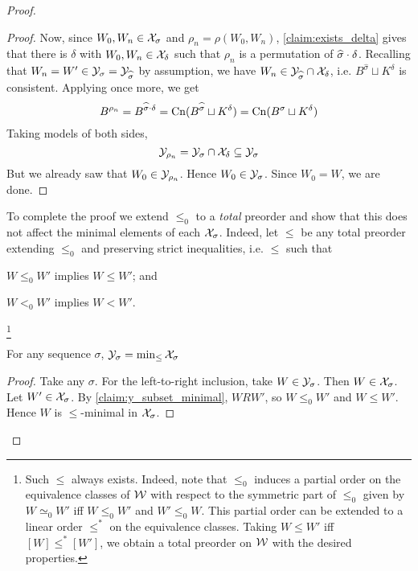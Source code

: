 \begin{proof}
\begin{proof}
        Now, since $W_0, W_n \in \mathcal{X}_\sigma$ and $\rho_n = \rho(W_0, W_n)$,
        \cref{claim:exists_delta} gives that there is $\delta$ with $W_0, W_n
        \in \mathcal{X}_{\delta}$ such that $\rho_n$ is a permutation of
        $\widehat{\sigma} \cdot \delta$. Recalling that $W_n = W' \in
        \mathcal{Y}_\sigma = \mathcal{Y}_{\widehat{\sigma}}$ by assumption, we have $W_n \in
        \mathcal{Y}_{\widehat{\sigma}} \cap \mathcal{X}_\delta$, i.e. $B^{\widehat{\sigma}}
        \sqcup K^\delta$ is consistent. Applying \incvac{} once
        more, we get
        \[
            B^{\rho_n}
            = B^{\widehat{\sigma} \cdot \delta}
            = \operatorname{Cn}(B^{\widehat{\sigma}} \sqcup K^\delta)
            = \operatorname{Cn}(B^{\sigma} \sqcup K^\delta)
        \]
        Taking models of both sides,
        \[
            \mathcal{Y}_{\rho_n} = \mathcal{Y}_{\sigma} \cap \mathcal{X}_\delta \subseteq \mathcal{Y}_\sigma
        \]
        But we already saw that $W_0 \in \mathcal{Y}_{\rho_n}$. Hence $W_0 \in
        \mathcal{Y}_\sigma$. Since $W_0 = W$, we are done.
    \end{proof}

To complete the proof we extend $\le_0$ to a \emph{total} preorder and show
that this does not affect the minimal elements of each $\mathcal{X}_\sigma$. Indeed, let
$\le$ be any total preorder extending $\le_0$ and preserving strict
inequalities, i.e. $\le$ such that
\begin{inlinelist}
    \item $W \le_0 W'$ implies $W \le W'$; and
    \item\label{item:strict_ineq_preserved} $W <_0 W'$ implies $W < W'$.
\end{inlinelist}\footnote{
    Such $\le$ always exists. Indeed, note that $\le_0$ induces a partial order
    on the equivalence classes of $\mathcal{W}$ with respect to the symmetric part of
    $\le_0$ given by $W \simeq_0 W'$ iff $W \le_0 W'$ and $W' \le_0 W$. This
    partial order can be extended to a linear order $\le^*$ on the equivalence
    classes. Taking $W \le W'$ iff $[W]  \le^* [W']$, we obtain a total
    preorder on $\mathcal{W}$ with the desired properties.
}

    \begin{claim}
        For any sequence $\sigma$, $\mathcal{Y}_\sigma = \min_{\le}{\mathcal{X}_\sigma}$
    \end{claim}
    \begin{proof}
        Take any $\sigma$. For the left-to-right inclusion, take $W \in
        \mathcal{Y}_\sigma$. Then $W \in \mathcal{X}_\sigma$. Let $W' \in \mathcal{X}_\sigma$. By
        \cref{claim:y_subset_minimal}, $W R W'$, so $W \le_0 W'$ and $W \le
        W'$. Hence $W$ is $\le$-minimal in $\mathcal{X}_\sigma$.


\end{proof}
\end{proof}
